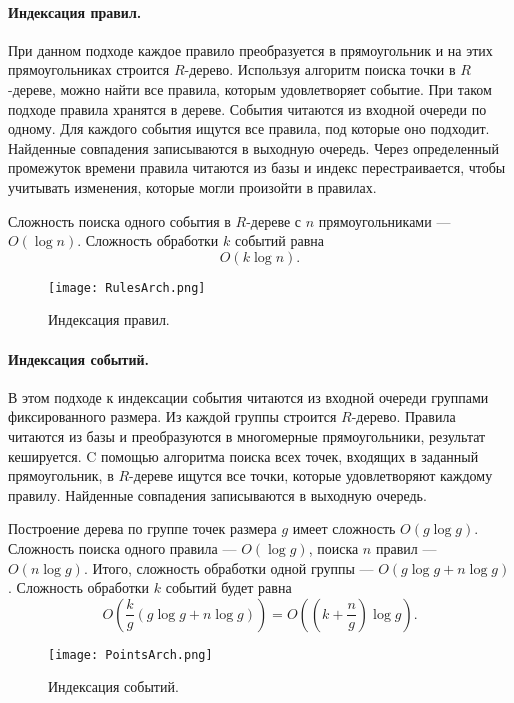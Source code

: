 \documentclass[14pt]{article}
\begin{document}
\paragraph{Индексация правил.} При данном подходе каждое правило преобразуется в прямоугольник и на этих прямоугольниках строится $R$-дерево. Используя алгоритм поиска точки в $R$-дереве, можно найти все правила, которым удовлетворяет событие. При таком подходе правила хранятся в дереве. События читаются из входной очереди по одному. Для каждого события ищутся все правила, под которые оно подходит. Найденные совпадения записываются в выходную очередь. Через определенный промежуток времени правила читаются из базы и индекс перестраивается, чтобы учитывать изменения, которые могли произойти в правилах.

Сложность поиска одного события в $R$-дереве с $n$ прямоугольниками --- $O(\log n)$. Сложность обработки $k$ событий равна
$$O(k \log n).$$

\begin{figure}[h]
  \centering
    \texttt{[image: RulesArch.png]}
  \caption{Индексация правил.}
\end{figure}

\paragraph{Индексация событий.} В этом подходе к индексации события читаются из входной очереди группами фиксированного размера. Из каждой группы строится $R$-дерево. Правила читаются из базы и преобразуются в многомерные прямоугольники, результат кешируется. C помощью алгоритма поиска всех точек, входящих в заданный прямоугольник, в $R$-дереве ищутся все точки, которые удовлетворяют каждому правилу. Найденные совпадения записываются в выходную очередь.

Построение дерева по группе точек размера $g$ имеет сложность $O(g\log g)$. Сложность поиска одного правила --- $O(\log g)$, поиска $n$ правил --- $O(n\log g)$. Итого, сложность обработки одной группы --- $O(g\log g + n\log g)$. Сложность обработки $k$ событий будет равна
$$ O\left(\frac{k}{g}(g\log g + n\log g)\right) = O\left(\left(k + \frac{n}{g}\right)\log g\right). $$

\begin{figure}[h]
  \centering
    \texttt{[image: PointsArch.png]}
  \caption{Индексация событий.}
\end{figure}
\end{document}
